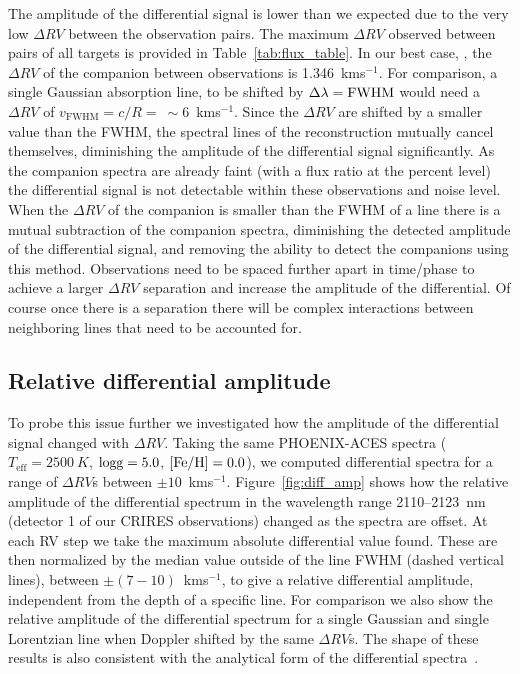 The amplitude of the differential signal is lower than we expected due to the very low \(\Delta RV\) between the observation pairs. The maximum \(\Delta RV\) observed between pairs of all targets is provided in Table~\ref{tab:flux_table}.
In our best case, ,  the \(\Delta RV\) of the companion between observations is 1.346~kms\(^{-1}\). For comparison, a single Gaussian absorption line, to be shifted by \(\Delta\lambda = \rm FWHM\) would need a \(\Delta RV\) of \(v_{\textrm{FWHM}} = c/R =~\sim6\)~kms\(^{-1}\). Since the \(\Delta RV\) are shifted by a smaller value than the FWHM, the spectral lines of the reconstruction mutually cancel themselves, diminishing the amplitude of the differential signal significantly. As the companion spectra are already faint (with a flux ratio at the percent level) the differential signal is not detectable within these observations and noise level.
When the \(\Delta RV \) of the companion is smaller than the FWHM of a line there is a mutual subtraction of the companion spectra, diminishing the detected amplitude of the differential signal, and removing the ability to detect the companions using this method. Observations need to be spaced further apart in time/phase to achieve a larger \(\Delta RV\) separation and increase the amplitude of the differential. Of course once there is a separation there will be complex interactions between neighboring lines that need to be accounted for.

\subsection{Relative differential amplitude}
To probe this issue further we investigated how the amplitude of the differential signal changed with \(\Delta RV \). Taking the same PHOENIX-ACES spectra (\(T_{\textrm{eff}} = 2500~K \), \(\rm logg=5.0 \), \(\rm [Fe/H]=0.0 \)), we computed differential spectra for a range of \(\Delta RV\)s between \(\pm10\)~kms\(^{-1}\). Figure~\ref{fig:diff_amp} shows how the relative amplitude of the differential spectrum in the wavelength range 2110--2123~nm (detector 1 of our CRIRES observations) changed as the spectra are offset. At each RV step we take the maximum absolute differential value found. These are then normalized by the median value outside of the line FWHM (dashed vertical lines), between \(\pm(7-10)\)~kms\(^{-1}\), to give a relative differential amplitude, independent from the depth of a specific line. For comparison we also show the relative amplitude of the differential spectrum for a single Gaussian and single Lorentzian line when Doppler shifted by the same \(\Delta RV \)s. The shape of these results is also consistent with the analytical form of the differential spectra~\citet[][eqn.~A.1]{ferluga_separating_1997}.

